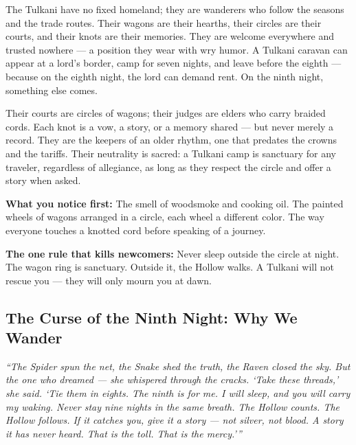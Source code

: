 \vspace{2mm}
\begin{tcolorbox}[colback=black!3,colframe=blue!60!black,title={Theme \& Atmosphere},breakable]
The Tulkani have no fixed homeland; they are wanderers who follow the seasons and the trade routes. Their wagons are their hearths, their circles are their courts, and their knots are their memories. They are welcome everywhere and trusted nowhere --- a position they wear with wry humor. A Tulkani caravan can appear at a lord's border, camp for seven nights, and leave before the eighth --- because on the eighth night, the lord can demand rent. On the ninth night, something else comes.

Their courts are circles of wagons; their judges are elders who carry braided cords. Each knot is a vow, a story, or a memory shared --- but never merely a record. They are the keepers of an older rhythm, one that predates the crowns and the tariffs. Their neutrality is sacred: a Tulkani camp is sanctuary for any traveler, regardless of allegiance, as long as they respect the circle and offer a story when asked.

\vspace{2mm}
\textbf{What you notice first:} The smell of woodsmoke and cooking oil. The painted wheels of wagons arranged in a circle, each wheel a different color. The way everyone touches a knotted cord before speaking of a journey.

\textbf{The one rule that kills newcomers:} Never sleep outside the circle at night. The wagon ring is sanctuary. Outside it, the Hollow walks. A Tulkani will not rescue you --- they will only mourn you at dawn.
\end{tcolorbox}

\subsection*{The Curse of the Ninth Night: Why We Wander}
\label{subsec:tulkani-origin}

\begin{tcolorbox}[colback=black!2,colframe=red!70!black,title={A Fragment of the Dream-Cord of the First Night (as sung by the Caravan Judges)},breakable]
\textit{``The Spider spun the net, the Snake shed the truth, the Raven closed the sky. But the one who dreamed --- she whispered through the cracks. `Take these threads,' she said. `Tie them in eights. The ninth is for me. I will sleep, and you will carry my waking. Never stay nine nights in the same breath. The Hollow counts. The Hollow follows. If it catches you, give it a story --- not silver, not blood. A story it has never heard. That is the toll. That is the mercy.'''}
\end{tcolorbox}

